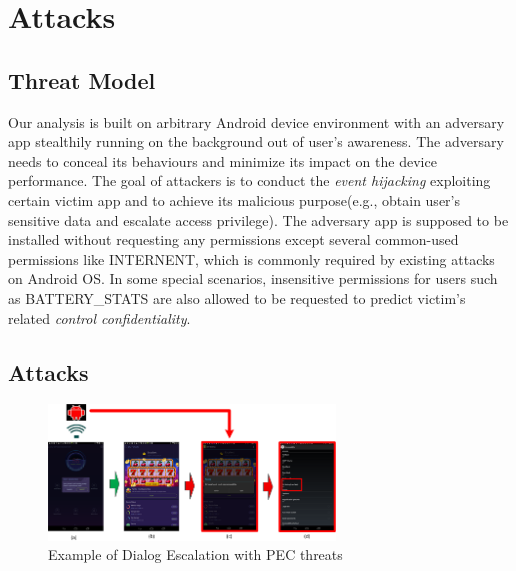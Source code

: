 \section{Attacks}


\subsection{Threat Model}
Our analysis is built on arbitrary Android device environment with an adversary app stealthily running on the background out of user's awareness.  The adversary needs to conceal its behaviours and minimize its impact on the device performance. The goal of attackers is to conduct the \emph{event hijacking} exploiting certain victim app and to achieve its malicious purpose(e.g., obtain user's sensitive data and escalate access privilege). The adversary app is supposed to be installed without requesting any permissions except several common-used permissions like INTERNENT, which is commonly required by existing attacks on Android OS\cite{chen2014peeking}\cite{ren2015towards}. In some special scenarios, insensitive permissions for users such as BATTERY\_STATS are also allowed to be requested to predict victim's related \emph{control confidentiality}. 


\subsection{Attacks}

\begin{figure}
\centering
\includegraphics[width = 3.0in]{pic2.png}
\caption{\label{}Example of Dialog Escalation with PEC threats}
\end{figure}

